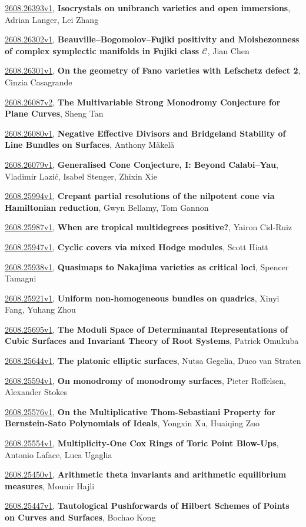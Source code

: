 \documentclass[9pt, a4paper]{article}
\theoremstyle{plain}
\theoremstyle{definition}
\theoremstyle{remark}
\newcommand{\arxiv}[3]{\href{https://arxiv.org/abs/#1}{#1}, \textbf{\textcolor{arxivblue}{#2}}, #3}
\begin{document}
\arxiv{2608.26393v1}{Isocrystals on unibranch varieties and open immersions}{Adrian Langer, Lei Zhang}

\arxiv{2608.26302v1}{Beauville--Bogomolov--Fujiki positivity and Moishezonness of complex symplectic manifolds in Fujiki class $\mathscr C$}{Jian Chen}

\arxiv{2608.26301v1}{On the geometry of Fano varieties with Lefschetz defect 2}{Cinzia Casagrande}

\arxiv{2608.26087v2}{The Multivariable Strong Monodromy Conjecture for Plane Curves}{Sheng Tan}

\arxiv{2608.26080v1}{Negative Effective Divisors and Bridgeland Stability of Line Bundles on Surfaces}{Anthony Mäkelä}

\arxiv{2608.26079v1}{Generalised Cone Conjecture, I: Beyond Calabi--Yau}{Vladimir Lazić, Isabel Stenger, Zhixin Xie}

\arxiv{2608.25994v1}{Crepant partial resolutions of the nilpotent cone via Hamiltonian reduction}{Gwyn Bellamy, Tom Gannon}

\arxiv{2608.25987v1}{When are tropical multidegrees positive?}{Yairon Cid-Ruiz}

\arxiv{2608.25947v1}{Cyclic covers via mixed Hodge modules}{Scott Hiatt}

\arxiv{2608.25938v1}{Quasimaps to Nakajima varieties as critical loci}{Spencer Tamagni}

\arxiv{2608.25921v1}{Uniform non-homogeneous bundles on quadrics}{Xinyi Fang, Yuhang Zhou}

\arxiv{2608.25695v1}{The Moduli Space of Determinantal Representations of Cubic Surfaces and Invariant Theory of Root Systems}{Patrick Omukuba}

\arxiv{2608.25644v1}{The platonic elliptic surfaces}{Nutsa Gegelia, Duco van Straten}

\arxiv{2608.25594v1}{On monodromy of monodromy surfaces}{Pieter Roffelsen, Alexander Stokes}

\arxiv{2608.25576v1}{On the Multiplicative Thom-Sebastiani Property for Bernstein-Sato Polynomials of Ideals}{Yongxin Xu, Huaiqing Zuo}

\arxiv{2608.25554v1}{Multiplicity-One Cox Rings of Toric Point Blow-Ups}{Antonio Laface, Luca Ugaglia}

\arxiv{2608.25450v1}{Arithmetic theta invariants and arithmetic equilibrium measures}{Mounir Hajli}

\arxiv{2608.25447v1}{Tautological Pushforwards of Hilbert Schemes of Points on Curves and Surfaces}{Bochao Kong}
\end{document}
